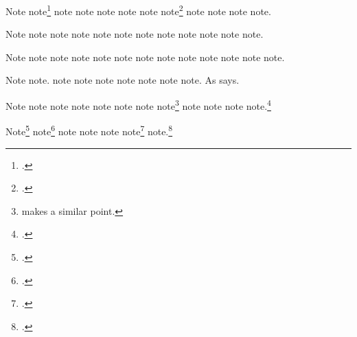 \documentclass[a4paper,12pt]{report}
\begin{document}
Note\autocite{schweitzer:bach}
note\footnote{.}
note\autocite{shapey:partita} note\autocite{sechzer:women}
note\autocite{sirosh:visualcortex} note\autocite{sereny:cries}
note\autocite{silver:gawain}
note\footnote{.}
note\autocite{soltes:georgia} note\autocite{sirosh:visualcortex}
note\autocite{spock:interview} note\autocite{shapey:partita}.

Note\autocite{stenger:privacy} note\autocite{silver:gawain}
note\autocite{tillich:system} note\autocite{soltes:georgia}
note\autocite{spock:interview} note\autocite{times:guide}
note\autocite{twain:audio} note\autocite{virginia:plantation}
note\autocite{stenger:privacy} note\autocite{chicago:manual}
note\autocite{twain:audio} note\autocite[2:45]{tillich:system}.

Note\autocite[police ranks]{times:guide}
note\autocite{virginia:plantation} note\autocite{chicago:manual}
note\autocite{unsigned:ranke} note\autocite{herwign:office}
note\autocite{verdi:corsaro} note\autocite{wallraff:word}
note\autocite{unsigned:ranke} note\autocite{warr:ellison}
note\autocite{herwign:office} note\autocite{wallraff:word}
note\autocite{verdi:corsaro} note\autocite{wauchope:ceramics}.

Note\autocite{weed:flatiron} note\autocite{weresz}.
note\autocite{white:callimachus} note\autocite{white:ross:memo}
note\autocite{warr:ellison} note\autocite{weed:flatiron}
note\autocite{wikiped:bibtex} note\autocite{will:cohere}
note\autocite{wauchope:ceramics}.  As \textcite{zukowsky:chicago}
says.

Note\autocite{weresz} note\autocite{white:russ}
note\autocite{white:callimachus} note\autocite{white:ross:memo}
note\autocite{white:russ} note\autocite[BibTeX]{wikiped:bibtex}
note\autocite{will:cohere} note\footnote{\textcite{zukowsky:chicago}
  makes a similar point.}
note\autocites[See][3.2.996b5--8]{aristotle:metaphy:gr}[360e--361b]
{plato:republic:gr}[and also][for additional
information]{white:callimachus} note\autocite{aristotle:metaphy:trans}
note\autocites[See][]{mchugh:wake}[and][569]{warr:ellison}
note.\footnote{.}

Note\footnote{.}
note\footnote{.}
note\autocite[3:126]{meredith:letters} note
note\autocite[2]{weresz} note\footnote{.}
note.\footnote{\cite*{zukowsky:chicago}.}

\nocite{furet:passing:fr,house:papers}

\printshorthands

\printbibliography[notkeyword=original]
\end{document}
